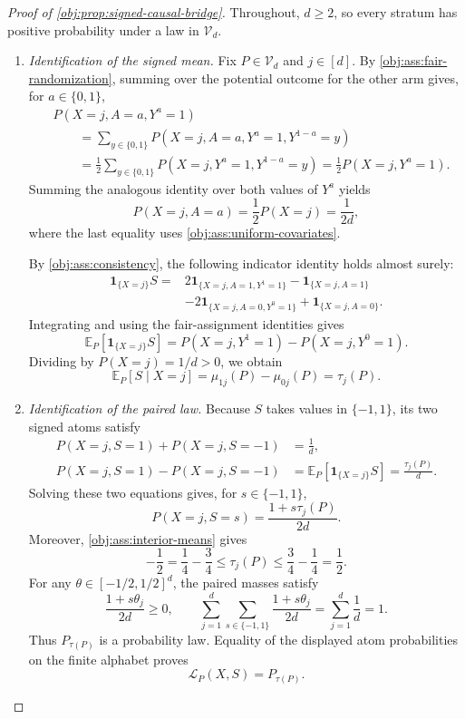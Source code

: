 \documentclass[11pt]{article}
\begin{document}
\begin{proof}[Proof of \cref{obj:prop:signed-causal-bridge}]
Throughout, \(d\ge2\), so every stratum has positive probability under a law in \(\mathcal V_d\).

\begin{enumerate}
\item \emph{Identification of the signed mean.}
Fix \(P\in\mathcal V_d\) and \(j\in[d]\). By \cref{obj:ass:fair-randomization}, summing over the potential outcome for the other arm gives, for \(a\in\{0,1\}\),
\[
\begin{aligned}
&P(X=j,A=a,Y^a=1)\\
&\qquad=\sum_{y\in\{0,1\}}
 P(X=j,A=a,Y^a=1,Y^{1-a}=y)\\
&\qquad=\frac12\sum_{y\in\{0,1\}}
 P(X=j,Y^a=1,Y^{1-a}=y)
 =\frac12P(X=j,Y^a=1).
\end{aligned}
\]
Summing the analogous identity over both values of \(Y^a\) yields
\[
P(X=j,A=a)=\frac12P(X=j)=\frac1{2d},
\]
where the last equality uses \cref{obj:ass:uniform-covariates}.

By \cref{obj:ass:consistency}, the following indicator identity holds almost surely:
\[
\begin{aligned}
\mathbf1_{\{X=j\}}S
={}&2\mathbf1_{\{X=j,A=1,Y^1=1\}}
-\mathbf1_{\{X=j,A=1\}}\\
&-2\mathbf1_{\{X=j,A=0,Y^0=1\}}
+\mathbf1_{\{X=j,A=0\}}.
\end{aligned}
\]
Integrating and using the fair-assignment identities gives
\[
\mathbb E_P[\mathbf1_{\{X=j\}}S]
=P(X=j,Y^1=1)-P(X=j,Y^0=1).
\]
Dividing by \(P(X=j)=1/d>0\), we obtain
\[
\mathbb E_P[S\mid X=j]
=\mu_{1j}(P)-\mu_{0j}(P)
=\tau_j(P).
\]

\item \emph{Identification of the paired law.}
Because \(S\) takes values in \(\{-1,1\}\), its two signed atoms satisfy
\[
\begin{aligned}
P(X=j,S=1)+P(X=j,S=-1)&=\frac1d,\\
P(X=j,S=1)-P(X=j,S=-1)
&=\mathbb E_P[\mathbf1_{\{X=j\}}S]
=\frac{\tau_j(P)}d.
\end{aligned}
\]
Solving these two equations gives, for \(s\in\{-1,1\}\),
\[
P(X=j,S=s)=\frac{1+s\tau_j(P)}{2d}.
\]
Moreover, \cref{obj:ass:interior-means} gives
\[
-\frac12
=\frac14-\frac34
\le \tau_j(P)
\le \frac34-\frac14
=\frac12.
\]
For any \(\theta\in[-1/2,1/2]^d\), the paired masses satisfy
\[
\frac{1+s\theta_j}{2d}\ge0,
\qquad
\sum_{j=1}^d\sum_{s\in\{-1,1\}}
\frac{1+s\theta_j}{2d}
=\sum_{j=1}^d\frac1d=1.
\]
Thus \(P_{\tau(P)}\) is a probability law. Equality of the displayed atom probabilities on the finite alphabet proves
\[
\mathcal L_P(X,S)=P_{\tau(P)}.
\]


\end{enumerate}
\end{proof}
\end{document}
